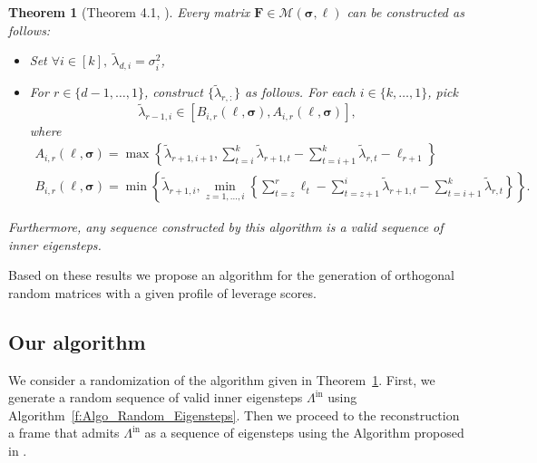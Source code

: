 \documentclass[twoside,11pt]{book}
\newtheorem{theorem}{Theorem}
\numberwithin{theorem}{chapter}
\numberwithin{definition}{chapter}
\numberwithin{proposition}{chapter}
\numberwithin{corollary}{chapter}
\numberwithin{example}{chapter}
\numberwithin{lemma}{chapter}
\numberwithin{assumption}{chapter}
\numberwithin{equation}{chapter}
\numberwithin{figure}{chapter}
\begin{document}
\begin{subappendices}
\begin{theorem}[Theorem 4.1, \citealp{FMPS13}]\label{thm:parametrization_of_polytope}
Every matrix $\bm{F}\in\mathcal{M}({\bm{\sigma},\bm{\ell}})$ can be constructed as follows:
\begin{itemize}
    \item Set $\forall i \in [k], \: \tilde\lambda_{d,i} = \sigma_{i}^2$,
    \item For $r \in \{d-1, \dots, 1 \}$, construct $\{\tilde\lambda_{r,:}\}$ as follows. For each $i \in \{k, \dots , 1\}$, pick $$\tilde\lambda_{r-1,i} \in [B_{i,r}(\bm{\ell},\bm{\sigma}),A_{i,r}(\bm{\ell},\bm{\sigma})],$$ where
    \begin{equation}
    \begin{split}
      A_{i,r}(\bm{\ell},\bm{\sigma}) = \max \left\{\tilde\lambda_{r+1,i+1}, \sum\limits_{t = i}^{k}\tilde\lambda_{r+1,t} - \sum\limits_{t = i+1}^{k}\tilde\lambda_{r,t} - \ell_{r+1} \right\}\\
      B_{i,r}(\bm{\ell},\bm{\sigma}) = \min \left\{\tilde\lambda_{r+1,i}, \min\limits_{z = 1,\dots,i} \left\{\sum\limits_{t=z}^{r}\ell_{t} - \sum\limits_{t=z+1}^{i}\tilde\lambda_{r+1,t} - \sum\limits_{t=i+1}^{k}\tilde\lambda_{r,t}\right\} \right\}.
    \end{split}
    \end{equation}
  \end{itemize}
Furthermore, any sequence constructed by this algorithm is a valid sequence of inner eigensteps.
\end{theorem}

Based on these results we propose an algorithm for the generation of orthogonal random matrices with a given profile of leverage scores.

\subsection{Our algorithm}
We consider a randomization of the algorithm given in Theorem~\ref{thm:parametrization_of_polytope}.
First, we generate a random sequence of valid inner eigensteps $\Lambda^{\text{in}}$ using Algorithm~\ref{f:Algo_Random_Eigensteps}. Then we proceed to the reconstruction a frame that admits $\Lambda^{\text{in}}$ as a sequence of eigensteps using the Algorithm proposed in \parencite{FiMiPo11}.


\end{subappendices}
\end{document}

